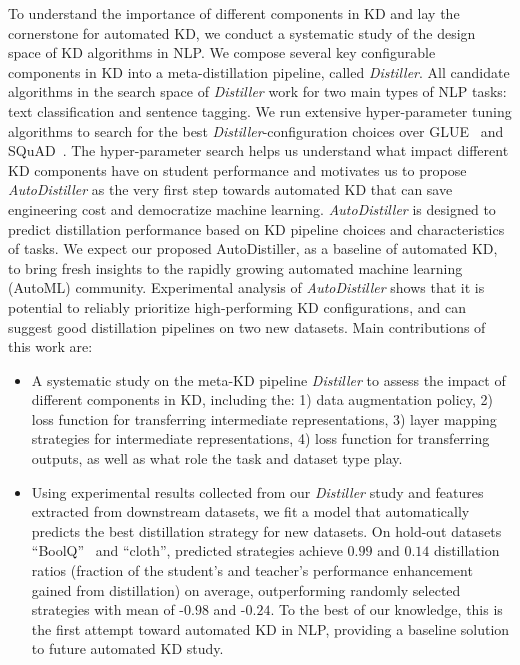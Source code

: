 \documentclass[11pt]{article}
\begin{document}
To understand the importance of different components in KD and lay the cornerstone for automated KD, we conduct a systematic study of the design space of KD algorithms in NLP. We compose several key configurable components in KD into a meta-distillation pipeline, called \emph{Distiller}. All candidate algorithms in the search space of \emph{Distiller} work for two main types of NLP tasks: text classification and sentence tagging. We run extensive hyper-parameter tuning algorithms to search for the best \emph{Distiller}-configuration choices over GLUE~\citep{wang2018glue} and SQuAD~\citep{rajpurkar2016squad}. The hyper-parameter search helps us understand what impact different KD components have on student performance and motivates us to propose \emph{AutoDistiller} as the very first step towards automated KD that can save engineering cost and democratize machine learning. \emph{AutoDistiller} is designed to predict distillation performance based on KD pipeline choices and characteristics of tasks. We expect our proposed AutoDistiller, as a baseline of automated KD, to bring fresh insights to the rapidly growing automated machine learning (AutoML) community. Experimental analysis of \emph{AutoDistiller} shows that it is potential to reliably prioritize high-performing KD configurations, and can suggest good distillation pipelines on two new datasets. Main contributions of this work are:


\begin{itemize}
    \item A systematic study on the meta-KD pipeline \emph{Distiller} to assess the impact of different components in KD, including the: 1) data augmentation policy, 2) loss function for transferring intermediate representations, 3) layer mapping strategies for intermediate representations, 4) loss function for transferring outputs, as well as what role the task and dataset type play.
    \item Using experimental results collected from our \emph{Distiller} study and features extracted from downstream datasets, we fit a model that automatically predicts the best distillation strategy for new datasets. On hold-out datasets ``BoolQ''~\citep{wang2019superglue} and ``cloth'',  predicted strategies achieve $0.99$ and $0.14$ distillation ratios (fraction of the student's and teacher's performance enhancement gained from distillation) on average, outperforming randomly selected strategies with mean of -$0.98$ and -$0.24$. To the best of our knowledge, this is the first attempt toward automated KD in NLP, providing a baseline solution to future automated KD study.
\end{itemize}
\vspace{-1em}
\end{document}
